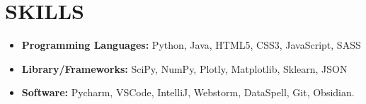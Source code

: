 \documentclass[a4paper,9pt]{extarticle}
\begin{document}
\section*{SKILLS}
\begin{itemize}
    \item \textbf{Programming Languages:} Python, Java, HTML5, CSS3, JavaScript, SASS %
    \item \textbf{Library/Frameworks:} SciPy, NumPy, Plotly, Matplotlib, Sklearn, JSON
    \item \textbf{Software:} Pycharm, VSCode, IntelliJ, Webstorm, DataSpell, Git, Obsidian. %
    
    
\end{itemize}

\end{document}
